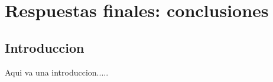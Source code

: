 
\chapter{Respuestas finales: conclusiones} %
\label{Chapter5}


\section{Introduccion }
Aqui va una introduccion.....
